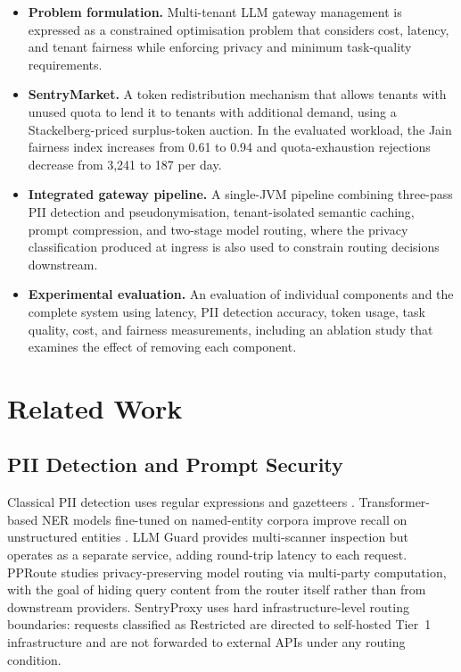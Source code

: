 \documentclass[conference]{IEEEtran}
\begin{document}
\begin{itemize}
    \item \textbf{Problem formulation.} Multi-tenant LLM gateway management is expressed as a constrained optimisation problem that considers cost, latency, and tenant fairness while enforcing privacy and minimum task-quality requirements.

    \item \textbf{SentryMarket.} A token redistribution mechanism that allows tenants with unused quota to lend it to tenants with additional demand, using a Stackelberg-priced surplus-token auction. In the evaluated workload, the Jain fairness index increases from 0.61 to 0.94 and quota-exhaustion rejections decrease from 3,241 to 187 per day.

    \item \textbf{Integrated gateway pipeline.} A single-JVM pipeline combining three-pass PII detection and pseudonymisation, tenant-isolated semantic caching, prompt compression, and two-stage model routing, where the privacy classification produced at ingress is also used to constrain routing decisions downstream.

    \item \textbf{Experimental evaluation.} An evaluation of individual components and the complete system using latency, PII detection accuracy, token usage, task quality, cost, and fairness measurements, including an ablation study that examines the effect of removing each component.
\end{itemize}

\section{Related Work}

\subsection{PII Detection and Prompt Security}
Classical PII detection uses regular expressions and gazetteers \cite{b_regex_pii}. Transformer-based NER models fine-tuned on named-entity corpora improve recall on unstructured entities \cite{b_spacy}. LLM Guard \cite{b_llmguard} provides multi-scanner inspection but operates as a separate service, adding round-trip latency to each request. PPRoute \cite{b_pproute} studies privacy-preserving model routing via multi-party computation, with the goal of hiding query content from the router itself rather than from downstream providers. SentryProxy uses hard infrastructure-level routing boundaries: requests classified as Restricted are directed to self-hosted Tier~1 infrastructure and are not forwarded to external APIs under any routing condition.
\end{document}
